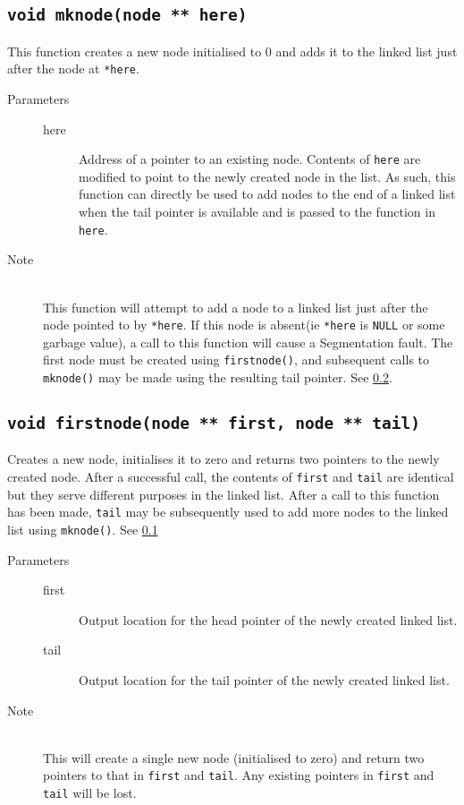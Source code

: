 \documentclass{article}
\begin{document}
\subsection{\lstinline{void mknode(node ** here)}} \label{sec:mknode}
This function creates a new node initialised to 0 and adds it to the linked list just after the node at \lstinline{*here}.
\begin{description}
	\item[Parameters]\hfill
	\begin{description}
		\item[here] Address of a pointer to an existing node. Contents of \lstinline{here} are modified to point to the newly created node in the list. As such, this function can directly be used to add nodes to the end of a linked list when the tail pointer is available and is passed to the function in \lstinline{here}.
	\end{description}
	\item[Note]\hfill\\
		This function will attempt to add a node to a linked list just after the node pointed to by \lstinline{*here}. If this node is absent(ie \lstinline{*here} is \lstinline{NULL} or some garbage value), a call to this function will cause a Segmentation fault. The first node must be created using \lstinline{firstnode()}, and subsequent calls to \lstinline{mknode()} may be made using the resulting tail pointer. See \ref{sec:firstnode}.
\end{description}

\subsection{\lstinline{void firstnode(node ** first, node ** tail)}} \label{sec:firstnode}
Creates a new node, initialises it to zero and returns two pointers to the newly created node. After a successful call, the contents of \lstinline{first} and \lstinline{tail} are identical but they serve different purposes in the linked list. After a call to this function has been made, \lstinline{tail} may be subsequently used to add more nodes to the linked list using \lstinline{mknode()}. See \ref{sec:mknode}
\begin{description}
	\item[Parameters]\hfill
	\begin{description}
		\item[first] Output location for the head pointer of the newly created linked list.
		\item[tail] Output location for the tail pointer of the newly created linked list.
	\end{description}
	\item[Note]\hfill\\
		This will create a single new node (initialised to zero) and return two pointers to that in \lstinline{first} and \lstinline{tail}. Any existing pointers in \lstinline{first} and \lstinline{tail} will be lost.
\end{description}
\end{document}
